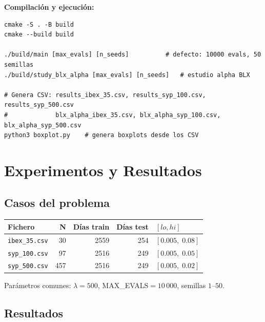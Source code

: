 \documentclass[12pt,a4paper]{article}
\begin{document}
\textbf{Compilación y ejecución:}
\begin{verbatim}
cmake -S . -B build
cmake --build build

./build/main [max_evals] [n_seeds]          # defecto: 10000 evals, 50 semillas
./build/study_blx_alpha [max_evals] [n_seeds]   # estudio alpha BLX

# Genera CSV: results_ibex_35.csv, results_syp_100.csv, results_syp_500.csv
#             blx_alpha_ibex_35.csv, blx_alpha_syp_100.csv, blx_alpha_syp_500.csv
python3 boxplot.py    # genera boxplots desde los CSV
\end{verbatim}

\section{Experimentos y Resultados}
\label{sec:experimentos}

\subsection{Casos del problema}

\begin{center}
\begin{tabular}{lrrrl}
\toprule
\textbf{Fichero} & \textbf{N} & \textbf{Días train} & \textbf{Días test} & \textbf{$[lo, hi]$} \\
\midrule
\texttt{ibex\_35.csv}  & 30  & 2559 & 254 & $[0.005,\;0.08]$ \\
\texttt{syp\_100.csv}  & 97  & 2516 & 249 & $[0.005,\;0.05]$ \\
\texttt{syp\_500.csv}  & 457 & 2516 & 249 & $[0.005,\;0.02]$ \\
\bottomrule
\end{tabular}
\end{center}

Parámetros comunes: $\lambda=500$, MAX\_EVALS$=10\,000$, semillas $1$--$50$.

\subsection{Resultados}
\end{document}
